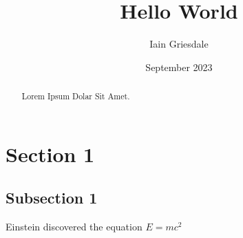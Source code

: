 \documentclass[titlepage]{article}
\title{Hello World}
\author{Iain Griesdale}
\date{September 2023}
\begin{document}
\maketitle

\begin{abstract}
    Lorem Ipsum Dolar Sit Amet.
\end{abstract}

\section{Section 1}

\subsection{Subsection 1}

Einstein discovered the equation $E=mc^2$

\begin{equation} \label{eq1}
    \begin{split}
        
    \end{split}
    
\end{equation}
\end{document}
